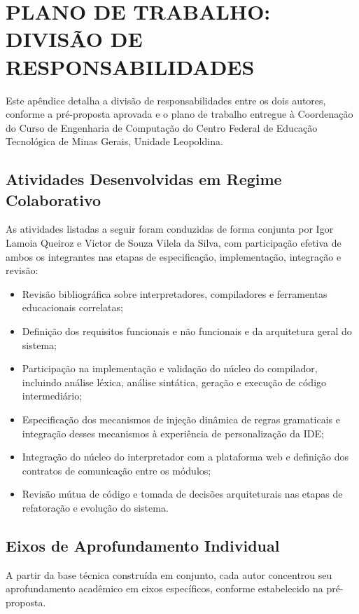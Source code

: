 
\chapter{PLANO DE TRABALHO: DIVISÃO DE RESPONSABILIDADES} \label{ap:plano}

Este apêndice detalha a divisão de responsabilidades entre os dois autores, conforme a pré-proposta aprovada e o plano de trabalho entregue à Coordenação do Curso de Engenharia de Computação do Centro Federal de Educação Tecnológica de Minas Gerais, Unidade Leopoldina.

\section{Atividades Desenvolvidas em Regime Colaborativo}

As atividades listadas a seguir foram conduzidas de forma conjunta por Igor Lamoia Queiroz e Victor de Souza Vilela da Silva, com participação efetiva de ambos os integrantes nas etapas de especificação, implementação, integração e revisão:

\begin{itemize}
    \item Revisão bibliográfica sobre interpretadores, compiladores e ferramentas educacionais correlatas;
    \item Definição dos requisitos funcionais e não funcionais e da arquitetura geral do sistema;
    \item Participação na implementação e validação do núcleo do compilador, incluindo análise léxica, análise sintática, geração e execução de código intermediário;
    \item Especificação dos mecanismos de injeção dinâmica de regras gramaticais e integração desses mecanismos à experiência de personalização da IDE;
    \item Integração do núcleo do interpretador com a plataforma web e definição dos contratos de comunicação entre os módulos;
    \item Revisão mútua de código e tomada de decisões arquiteturais nas etapas de refatoração e evolução do sistema.
\end{itemize}

\section{Eixos de Aprofundamento Individual}

A partir da base técnica construída em conjunto, cada autor concentrou seu aprofundamento acadêmico em eixos específicos, conforme estabelecido na pré-proposta.

